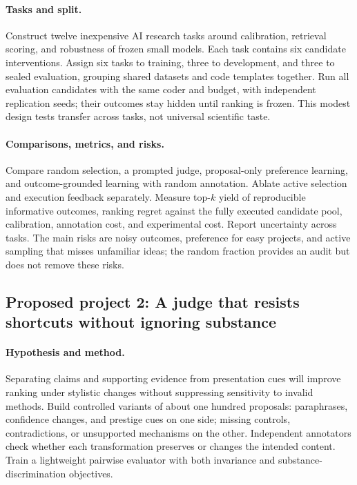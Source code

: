 \paragraph{Tasks and split.}
Construct twelve inexpensive AI research tasks around calibration, retrieval scoring, and robustness of frozen small models. Each task contains six candidate interventions. Assign six tasks to training, three to development, and three to sealed evaluation, grouping shared datasets and code templates together. Run all evaluation candidates with the same coder and budget, with independent replication seeds; their outcomes stay hidden until ranking is frozen. This modest design tests transfer across tasks, not universal scientific taste.

\paragraph{Comparisons, metrics, and risks.}
Compare random selection, a prompted judge, proposal-only preference learning, and outcome-grounded learning with random annotation. Ablate active selection and execution feedback separately. Measure top-$k$ yield of reproducible informative outcomes, ranking regret against the fully executed candidate pool, calibration, annotation cost, and experimental cost. Report uncertainty across tasks. The main risks are noisy outcomes, preference for easy projects, and active sampling that misses unfamiliar ideas; the random fraction provides an audit but does not remove these risks.

\subsection{Proposed project 2: A judge that resists shortcuts without ignoring substance}

\paragraph{Hypothesis and method.}
Separating claims and supporting evidence from presentation cues will improve ranking under stylistic changes without suppressing sensitivity to invalid methods. Build controlled variants of about one hundred proposals: paraphrases, confidence changes, and prestige cues on one side; missing controls, contradictions, or unsupported mechanisms on the other. Independent annotators check whether each transformation preserves or changes the intended content. Train a lightweight pairwise evaluator with both invariance and substance-discrimination objectives.

